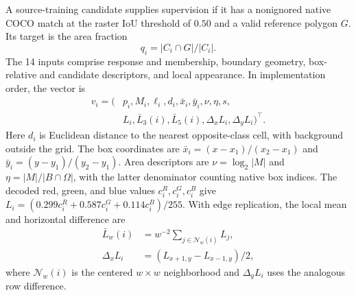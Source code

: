 A source-training candidate supplies supervision if it has a nonignored native COCO match at the raster IoU threshold of \(0.50\) and a valid reference polygon \(G\). Its target is the area fraction
\begin{equation}
q_i=|C_i\cap G|/|C_i| .
\label{eq:fractional-target}
\end{equation}
The 14 inputs comprise response and membership, boundary geometry, box-relative and candidate descriptors, and local appearance. In implementation order, the vector is
\begin{equation}
\begin{aligned}
v_i=\big(&p_i,M_i,\ell_i,d_i,\bar x_i,\bar y_i,\nu,\eta,s,\\
        &L_i,\bar L_3(i),\bar L_5(i),\Delta_x L_i,\Delta_y L_i\big)^\top .
\end{aligned}
\label{eq:endpoint-features}
\end{equation}
Here \(d_i\) is Euclidean distance to the nearest opposite-class cell, with background outside the grid. The box coordinates are \(\bar x_i=(x-x_1)/(x_2-x_1)\) and \(\bar y_i=(y-y_1)/(y_2-y_1)\). Area descriptors are \(\nu=\log_2|M|\) and \(\eta=|M|/|B\cap\Omega|\), with the latter denominator counting native box indices. The decoded red, green, and blue values \(c_i^R,c_i^G,c_i^B\) give \(L_i=(0.299c_i^R+0.587c_i^G+0.114c_i^B)/255\). With edge replication, the local mean and horizontal difference are
\begin{equation}
\begin{aligned}
\bar L_w(i)&=w^{-2}\!\!\sum_{j\in\mathcal N_w(i)}L_j,\\
\Delta_x L_i&=(L_{x+1,y}-L_{x-1,y})/2 ,
\end{aligned}
\label{eq:appearance-features}
\end{equation}
where \(\mathcal N_w(i)\) is the centered \(w\times w\) neighborhood and \(\Delta_y L_i\) uses the analogous row difference.

